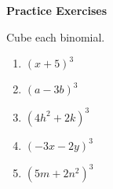 \textbf{Practice Exercises}

\vspce

Cube each binomial.   
\begin{enumerate}

\item \hspce $(x+5)^{3}$
\item \hspce $(a - 3b)^{3}$
\item \hspce $(4h^{2} + 2k)^{3}$
\item \hspce $(-3x - 2y)^{3}$
\item \hspce $(5m + 2n^{2})^{3}$

\end{enumerate}